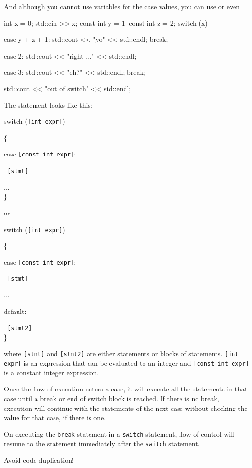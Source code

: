 And although you cannot use variables for the case values, you can use
 or even 

\begin{console}[commandchars=\~\@\$]
int x = 0;
std::cin >> x;
const int y = 1;
const int z = 2;
switch (x)
{
        case y + z + 1:
             std::cout << "yo" << std::endl;
             break;
        
        case 2:
             std::cout << "right ..." << std::endl;

        case 3:
             std::cout << "oh?" << std::endl;
             break;
}
std::cout << "out of switch" << std::endl;
\end{console}

\newpage{}

The statement looks like this:

switch (\texttt{{[}int expr{]}})

\{

case \texttt{{[}const int expr{]}}:

\texttt{ {[}stmt{]}}

...\\
\}

or

switch (\texttt{{[}int expr{]}})

\{

case \texttt{{[}const int expr{]}}:

\texttt{ {[}stmt{]}}

...

default:

\texttt{ {[}stmt2{]}}\\
\}

where \texttt{{[}stmt{]}} and \texttt{{[}stmt2{]}} are either statements or
blocks of statements. \texttt{{[}int expr{]}} is an expression that can be
evaluated to an integer and \texttt{{[}const int expr{]}} is a constant
integer expression.

Once the flow of execution enters a case, it will execute all the
statements in that case until a break or end of switch block is reached.
If there is no break, execution will continue with the statements of the
next case without checking the value for that case, if there is one.

On executing the \texttt{break} statement in a \texttt{switch} statement,
flow of control will resume to the statement immediately after the
\texttt{switch} statement.

\newpage{}


Avoid code duplication!
